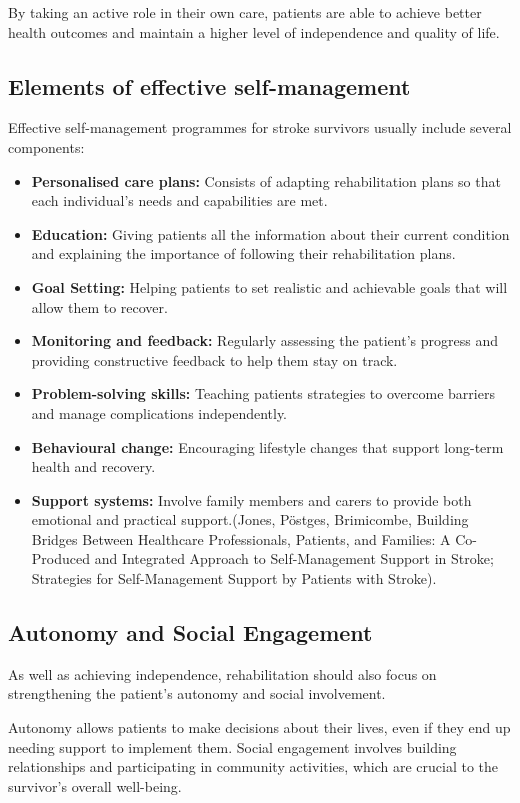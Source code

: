 By taking an active role in their own care, patients are able to achieve better health outcomes and maintain a higher level of independence and quality of life.

\subsection{Elements of effective self-management}
\label{sec:elementesofeffectiveselfmanagement}
Effective self-management programmes for stroke survivors usually include several components:
\begin{itemize}
  \item \textbf{Personalised care plans:}  Consists of adapting rehabilitation plans so that each individual's needs and capabilities are met.
  \item \textbf{Education:} Giving patients all the information about their current condition and explaining the importance of following their rehabilitation plans.
  \item \textbf{Goal Setting:} Helping patients to set realistic and achievable goals that will allow them to recover.
  \item \textbf{Monitoring and feedback:} Regularly assessing the patient's progress and providing constructive feedback to help them stay on track.
  \item \textbf{Problem-solving skills:} Teaching patients strategies to overcome barriers and manage complications independently.
  \item \textbf{Behavioural change:} Encouraging lifestyle changes that support long-term health and recovery.
  \item \textbf{Support systems:} Involve family members and carers to provide both emotional and practical support.(Jones, Pöstges,  Brimicombe, Building Bridges Between Healthcare Professionals, Patients, and Families: A Co-Produced and Integrated Approach to Self-Management Support in Stroke; Strategies for Self-Management Support by Patients with Stroke).
\end{itemize}

\subsection{Autonomy and Social Engagement}
\label{sec:autonomyandsocialengagement}
As well as achieving independence, rehabilitation should also focus on strengthening the patient's autonomy and social involvement. 


Autonomy allows patients to make decisions about their lives, even if they end up needing support to implement them. Social engagement involves building relationships and participating in community activities, which are crucial to the survivor's overall well-being. 


